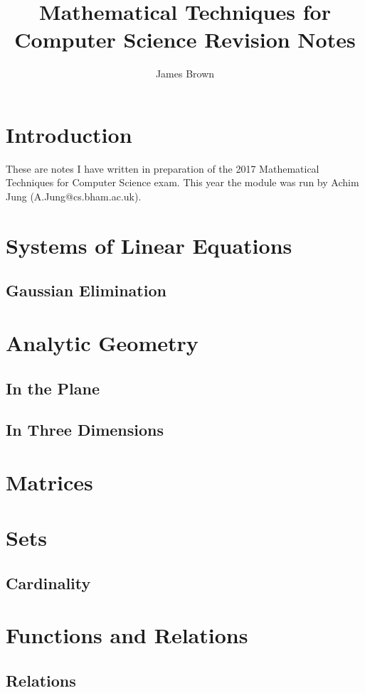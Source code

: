 \documentclass{article}
\title{Mathematical Techniques for Computer Science \linebreak Revision Notes}
\author{James Brown}
\begin{document}
	\maketitle
	\newpage
	\tableofcontents
	\newpage

	\section{Introduction}
	These are notes I have written in preparation of the 2017 Mathematical Techniques for Computer Science exam. This year the module was run by Achim Jung (A.Jung@cs.bham.ac.uk).
	
	\section{Systems of Linear Equations}
	\subsection{Gaussian Elimination}
	
	\section{Analytic Geometry}
	\subsection{In the Plane}
	\subsection{In Three Dimensions}
	
	\section{Matrices}
	
	\section{Sets}
	\subsection{Cardinality}

	\section{Functions and Relations}
	\subsection{Relations}
\end{document}
